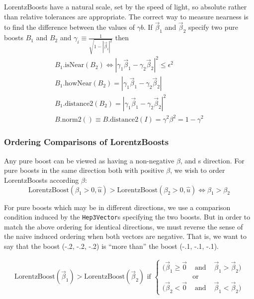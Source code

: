 \documentclass[twoside,12pt]{article}
\def \SV {{\tt Hep3Vector}}
\begin{document}
LorentzBoosts have a natural scale, set by the speed of light, so absolute
rather than relative tolerances are appropriate.
The correct way to measure nearness is to find the difference between the
values of $\gamma b$.  If $\vec{\beta}_1$ and 
$\vec{\beta}_2$ specify two pure boosts
$B_1$ and $B_2$
and $\gamma_i \equiv \frac{1}{\sqrt{1 - |\vec{\beta}_i|^2}}$ then
\begin{eqnarray}
\label{eq:nearboost}
    B_1 \mbox{.isNear} (B_2) \Longleftrightarrow
	\left| \gamma_1 \vec{\beta}_1 - \gamma_2 \vec{\beta}_2 \right|^2 \leq
	\epsilon^2
	\\
\label{eq:hownearboost}
    B_1 \mbox{.howNear} (B_2) =
	\left| \gamma_1 \vec{\beta}_1 - \gamma_2 \vec{\beta}_2 \right|
	\\
    B_1 \mbox{.distance2} (B_2) =
	\left| \gamma_1 \vec{\beta}_1 - \gamma_2 \vec{\beta}_2 \right|^2
	\\
\label{eq:boostnorm2}
    B\mbox{.norm2}( ) \equiv B\mbox{.distance2} (I) 
					= \gamma^2 \beta^2 = 1 - \gamma^2 
\end{eqnarray}

\subsubsection{Ordering Comparisons of LorentzBoosts}

Any pure boost can be viewed as having a non-negative $\beta$, and s
direction.
For pure boosts in the same direction both with positive $\beta$,
we wish to order LorentzBoosts according $\beta$:
\begin{equation}
\label{ordboost}
  \mbox{LorentzBoost}( \beta_1 > 0, \hat{u} ) >
  \mbox{LorentzBoost}( \beta_2 > 0, \hat{u} ) \Longleftrightarrow
  \beta_1 > \beta_2
\end{equation}

For pure boosts which may be in different directions,
we use a comparison
condition induced by the \SV s specifying the two boosts.
But in order to match the above ordering for identical directions, we must
reverse the sense of the naive induced ordering when both vectors are
negative.  That is, we want to say that the boost (-.2, -.2, -.2) is
``more than'' the boost (-.1, -.1, -.1).

\begin{eqnarray}
  \mbox{LorentzBoost}( \vec{\beta}_1 ) > \mbox{LorentzBoost}( \vec{\beta}_2 )
	\mbox{ if }
\left\{
  \begin{array}{ccc}
  ( \vec{\beta}_1 \geq \vec{0} & \mbox{ and } &
  \vec{\beta}_1 > \vec{\beta}_2 ) \\
	& \mbox{or} \\
  ( \vec{\beta}_2 < \vec{0} & \mbox{ and } &
  \vec{\beta}_1 < \vec{\beta}_2 )
  \end{array}
\right.
\end{eqnarray}
\end{document}
